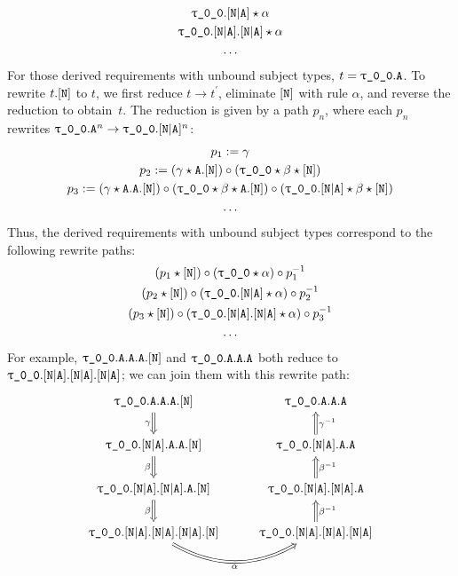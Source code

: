 \documentclass[../generics]{subfiles}
\begin{document}
\begin{example}
\begin{gather*}
\texttt{$\uptau$\_0\_0}.[\texttt{N}|\texttt{A}]\star\alpha\\
\texttt{$\uptau$\_0\_0}.[\texttt{N}|\texttt{A}].[\texttt{N}|\texttt{A}]\star\alpha\\
\ldots
\end{gather*}
For those derived requirements with unbound subject types, $t=\texttt{$\uptau$\_0\_0}.\texttt{A}$. To rewrite $t.[\texttt{N}]$ to $t$, we first reduce $t\rightarrow t^\prime$, eliminate $[\texttt{N}]$ with rule $\alpha$, and reverse the reduction to obtain~$t$. The reduction is given by a path $p_n$, where each $p_n$ rewrites $\texttt{$\uptau$\_0\_0}.\texttt{A}^n\rightarrow\texttt{$\uptau$\_0\_0}.[\texttt{N}|\texttt{A}]^n$:
\begin{gather*}
p_1:=\gamma\\
p_2:=(\gamma\star\texttt{A}.[\texttt{N}])\circ(\texttt{$\uptau$\_0\_0}\star\beta\star[\texttt{N}])\\
p_3:=(\gamma\star\texttt{A}.\texttt{A}.[\texttt{N}])\circ(\texttt{$\uptau$\_0\_0}\star\beta\star\texttt{A}.[\texttt{N}])\circ(\texttt{$\uptau$\_0\_0}.[\texttt{N}|\texttt{A}]\star\beta\star[\texttt{N}])\\
\ldots
\end{gather*}
Thus, the derived requirements with unbound subject types correspond to the following rewrite paths:
\begin{gather*}
(p_1\star[\texttt{N}])\circ(\texttt{$\uptau$\_0\_0}\star\alpha)\circ p_1^{-1}\\
(p_2\star[\texttt{N}])\circ(\texttt{$\uptau$\_0\_0}.[\texttt{N}|\texttt{A}]\star\alpha)\circ p_2^{-1}\\
(p_3\star[\texttt{N}])\circ(\texttt{$\uptau$\_0\_0}.[\texttt{N}|\texttt{A}].[\texttt{N}|\texttt{A}]\star\alpha)\circ p_3^{-1}\\
\ldots
\end{gather*}
For example, $\texttt{$\uptau$\_0\_0}.\texttt{A}.\texttt{A}.\texttt{A}.[\texttt{N}]$ and $\texttt{$\uptau$\_0\_0}.\texttt{A}.\texttt{A}.\texttt{A}$ both reduce to $\texttt{$\uptau$\_0\_0}.[\texttt{N}|\texttt{A}].[\texttt{N}|\texttt{A}].[\texttt{N}|\texttt{A}]$; we can join them with this rewrite path:
\[
\begin{tikzcd}
\ttgp{0}{0}.\texttt{A}.\texttt{A}.\texttt{A}.\protosym{N}
\arrow[d, Rightarrow, "\gamma"']&
\ttgp{0}{0}.\texttt{A}.\texttt{A}.\texttt{A}\\
\ttgp{0}{0}.\assocsym{N}{A}.\texttt{A}.\texttt{A}.\protosym{N}
\arrow[d, Rightarrow, "\beta"']&
\ttgp{0}{0}.\assocsym{N}{A}.\texttt{A}.\texttt{A}
\arrow[u, Rightarrow, "\gamma^{-1}"']\\
\ttgp{0}{0}.\assocsym{N}{A}.\assocsym{N}{A}.\texttt{A}.\protosym{N}
\arrow[d, Rightarrow, "\beta"']&
\ttgp{0}{0}.\assocsym{N}{A}.\assocsym{N}{A}.\texttt{A}
\arrow[u, Rightarrow, "\beta^{-1}"']\\
\ttgp{0}{0}.\assocsym{N}{A}.\assocsym{N}{A}.\assocsym{N}{A}.\protosym{N}
\arrow[r, Rightarrow, "\alpha"', bend right]&
\ttgp{0}{0}.\assocsym{N}{A}.\assocsym{N}{A}.\assocsym{N}{A}
\arrow[u, Rightarrow, "\beta^{-1}"']
\end{tikzcd}
\]


\end{example}
\end{document}

